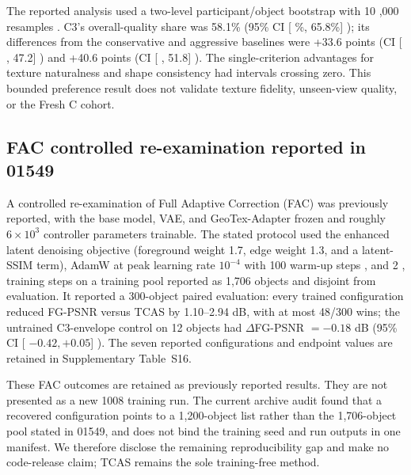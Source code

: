 \documentclass[times,twocolumn,final]{elsarticle}
\providecommand{\DIFadd}[1]{{\protect\color{blue} \sf #1}} %
\providecommand{\DIFaddbegin}{} %
\providecommand{\DIFaddend}{} %
\begin{document}
The  
 \DIFaddbegin \DIFadd{reported analysis used }\DIFaddend a two-level   \DIFaddbegin \DIFadd{participant/object bootstrap with }\DIFaddend 10  \DIFaddbegin \DIFadd{,}\DIFaddend 000 resamples  . C3's overall-quality share   \DIFaddbegin \DIFadd{was }\DIFaddend 58.1\% (95\% CI   \DIFaddbegin [\DIFadd{50.1\%, 65.8\%}]\DIFadd{); its differences from }\DIFaddend the conservative and aggressive baselines   \DIFaddbegin \DIFadd{were +33.6 points (CI }[\DIFadd{19.3, 47.2}]\DIFadd{) and +40.6 }\DIFaddend points (CI   \DIFaddbegin [\DIFadd{29.4, 51.8}]\DIFadd{). The }\DIFaddend single-criterion advantages   \DIFaddbegin \DIFadd{for texture naturalness and shape consistency had intervals crossing zero. This bounded preference result does not validate texture fidelity, unseen-view quality, or the Fresh C cohort}\DIFaddend .

  \DIFaddbegin \subsection{FAC controlled re-examination reported in 01549}
\label{subsec:facreported}
\DIFaddend 

  \DIFaddbegin \DIFadd{A controlled re-examination of Full Adaptive Correction (FAC) was previously reported, with the }\DIFaddend base model, VAE, and GeoTex-Adapter   \DIFaddbegin \DIFadd{frozen and roughly $6\times10^3$ controller parameters trainable. The stated protocol used the enhanced latent denoising objective (foreground weight 1.7, edge weight 1.3, and }\DIFaddend a latent-SSIM   \DIFaddbegin \DIFadd{term), AdamW at }\DIFaddend peak learning rate $10^{-4}$   \DIFaddbegin \DIFadd{with }\DIFaddend 100 warm-up steps  \DIFaddbegin \DIFadd{, and }\DIFaddend 2  , 
 \DIFaddbegin \DIFadd{000 training steps on a training pool reported as 1,706 objects and disjoint from evaluation. It reported a 300-object paired evaluation: every trained configuration reduced }\DIFaddend FG-PSNR   \DIFaddbegin \DIFadd{versus TCAS by 1.10--2.94 dB, with at most 48/300 wins; the untrained C3-envelope control on 12 objects had $\Delta$}\DIFaddend FG-PSNR   \DIFaddbegin \DIFadd{$=-0.18$ dB (}\DIFaddend 95\% CI   \DIFaddbegin [\DIFadd{$-0.42,+0.05$}]\DIFadd{). The seven reported configurations and endpoint values are retained in Supplementary Table~S16}\DIFaddend .

  \DIFaddbegin \DIFadd{These FAC outcomes are retained as previously reported results. They are not presented as a new 1008 training run. The current archive audit found that a recovered configuration points to a 1,200-object list rather than the 1,706-object pool stated in 01549, and does not bind the training seed and run outputs in one manifest}\DIFaddend . We therefore   \DIFaddbegin \DIFadd{disclose the remaining reproducibility gap and make no code-release claim; TCAS remains the sole training-free method}\DIFaddend .
\end{document}
